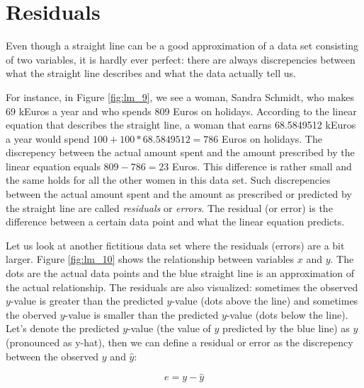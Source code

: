 \documentclass[]{report}\usepackage[]{graphicx}\usepackage[]{color}
\begin{document}
\section{Residuals}

Even though a straight line can be a good approximation of a data set consisting of two variables, it is hardly ever perfect: there are always discrepencies between what the straight line describes and what the data actually tell us.

For instance, in Figure \ref{fig:lm_9}, we see a woman, Sandra Schmidt, who makes 69 kEuros a year and who spends 809 Euros on holidays. According to the linear equation that describes the straight line, a woman that earns 68.5849512 kEuros a year would spend $100 + 100 * 68.5849512= 786$ Euros on holidays. The discrepency between the actual amount spent and the amount prescribed by the linear equation equals $809-786=23$ Euros. This difference is rather small and the same holds for all the other women in this data set. Such discrepencies between the actual amount spent and the amount as prescribed or predicted by the straight line are called \textit{residuals} or \textit{errors}. The residual (or error) is the difference between a certain data point and what the linear equation predicts.




Let us look at another fictitious data set where the residuals (errors) are a bit larger. Figure \ref{fig:lm_10} shows the relationship between variables $x$ and $y$. The dots are the actual data points and the blue straight line is an approximation of the actual relationship. The residuals are also visualized: sometimes the observed $y$-value is greater than the predicted $y$-value (dots above the line) and sometimes the oberved $y$-value is smaller than the predicted $y$-value (dots below the line). Let's denote the predicted $y$-value (the value of $y$ predicted by the blue line) as $\hat{y}$ (pronounced as y-hat), then we can define a residual or error as the discrepency between the observed $y$ and $\hat{y}$:

\begin{equation}
e = y - \hat{y}
\end{equation}
\end{document}
